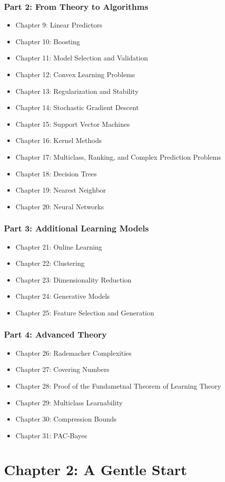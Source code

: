 \message{ !name(understanding_machine_learning.tex)}\documentclass{article}
\begin{document}
\section*{Part 2: From Theory to Algorithms}
\begin{itemize}
  \item Chapter 9: Linear Predictors
  \item Chapter 10: Boosting
  \item Chapter 11: Model Selection and Validation
  \item Chapter 12: Convex Learning Problems
  \item Chapter 13: Regularization and Stability
  \item Chapter 14: Stochastic Gradient Descent
  \item Chapter 15: Support Vector Machines
  \item Chapter 16: Kernel Methods
  \item Chapter 17: Multiclass, Ranking, and Complex Prediction Problems
  \item Chapter 18: Decision Trees
  \item Chapter 19: Nearest Neighbor
  \item Chapter 20: Neural Networks
\end{itemize}
\section*{Part 3: Additional Learning Models}
\begin{itemize}
  \item Chapter 21: Online Learning
  \item Chapter 22: Clustering
  \item Chapter 23: Dimensionality Reduction
  \item Chapter 24: Generative Models
  \item Chapter 25: Feature Selection and Generation
\end{itemize}

\section*{Part 4: Advanced Theory}
\begin{itemize}
  \item Chapter 26: Rademacher Complexities
  \item Chapter 27: Covering Numbers
  \item Chapter 28: Proof of the Fundametnal Theorem of Learning Theory
  \item Chapter 29: Multiclass Learnability
  \item Chapter 30: Compression Bounds
  \item Chapter 31: PAC-Bayes
\end{itemize}


\part*{Chapter 2: A Gentle Start}
\end{document}
